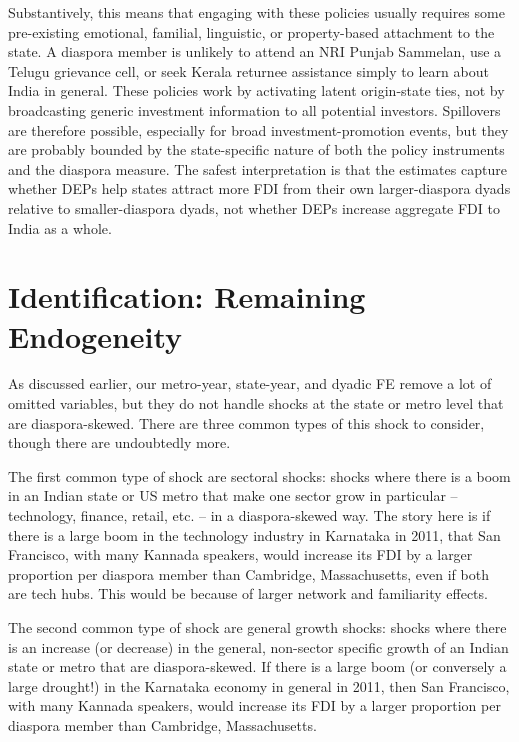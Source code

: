 \documentclass[doublespace,nopageskip]{UVAthesis}
\begin{document}
Substantively, this means that engaging with these policies usually requires some pre-existing emotional, familial, linguistic, or property-based attachment to the state. A diaspora member is unlikely to attend an NRI Punjab Sammelan, use a Telugu grievance cell, or seek Kerala returnee assistance simply to learn about India in general. These policies work by activating latent origin-state ties, not by broadcasting generic investment information to all potential investors. Spillovers are therefore possible, especially for broad investment-promotion events, but they are probably bounded by the state-specific nature of both the policy instruments and the diaspora measure. The safest interpretation is that the estimates capture whether DEPs help states attract more FDI from their own larger-diaspora dyads relative to smaller-diaspora dyads, not whether DEPs increase aggregate FDI to India as a whole.

\section{Identification: Remaining Endogeneity} \label{ss:endogeneity}

As discussed earlier, our metro-year, state-year, and dyadic FE remove a lot of omitted variables, but they do not handle shocks at the state or metro level that are diaspora-skewed. There are three common types of this shock to consider, though there are undoubtedly more.

The first common type of shock are sectoral shocks: shocks where there is a boom in an Indian state or US metro that make one sector grow in particular -- technology, finance, retail, etc. --  in a diaspora-skewed way. The story here is if there is a large boom in the technology industry in Karnataka in 2011, that San Francisco, with many Kannada speakers, would increase its FDI by a larger proportion per diaspora member than Cambridge, Massachusetts, even if both are tech hubs. This would be because of larger network and familiarity effects.

The second common type of shock are general growth shocks: shocks where there is an increase (or decrease) in the general, non-sector specific growth of an Indian state or metro that are diaspora-skewed. If there is a large boom (or conversely a large drought!) in the Karnataka economy in general in 2011, then San Francisco, with many Kannada speakers, would increase its FDI by a larger proportion per diaspora member than Cambridge, Massachusetts.
\end{document}
